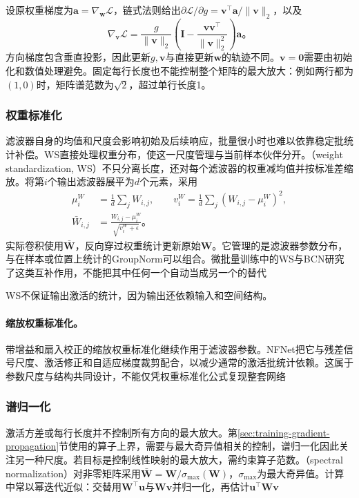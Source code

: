 设原权重梯度为$\bm a=\nabla_{\bm w}\mathcal L$，链式法则给出$\partial\mathcal L/\partial g=\bm v^{\top}\bm a/\lVert\bm v\rVert_2$，以及
\begin{equation}
  \nabla_{\bm v}\mathcal L
  =\frac{g}{\lVert\bm v\rVert_2}
    \left(\bm I-\frac{\bm v\bm v^{\top}}{\lVert\bm v\rVert_2^2}\right)\bm a\text{。}
  \label{eq:training-weightnorm-gradient}
\end{equation}
方向梯度包含垂直投影，因此更新$g,\bm v$与直接更新$\bm w$的轨迹不同。$\bm v=\bm0$需要由初始化和数值处理避免。固定每行长度也不能控制整个矩阵的最大放大：例如两行都为$(1,0)$时，矩阵谱范数为$\sqrt2$，超过单行长度1。

\subsubsection{权重标准化}
\label{sec:training-weight-standardization}
滤波器自身的均值和尺度会影响初始及后续响应，批量很小时也难以依靠稳定批统计补偿。WS直接处理权重分布，使这一尺度管理与当前样本伙伴分开。（weight standardization, WS）不只分离长度，还对每个滤波器的权重减均值并按标准差缩放。将第$i$个输出滤波器展平为$d$个元素，采用
\begin{equation}
  \begin{aligned}
    \mu_i^W&=\frac1d\sum_jW_{i,j},\qquad
    v_i^W=\frac1d\sum_j(W_{i,j}-\mu_i^W)^2,\\
    \bar W_{i,j}&=\frac{W_{i,j}-\mu_i^W}{\sqrt{v_i^W+\epsilon}}\text{。}
  \end{aligned}
  \label{eq:training-weight-standardization}
\end{equation}
实际卷积使用$\bar{\bm W}$，反向穿过权重统计更新原始$\bm W$。它管理的是滤波器参数分布，与在样本或位置上统计的GroupNorm可以组合。微批量训练中的WS与BCN研究了这类互补作用，不能把其中任何一个自动当成另一个的替代

WS不保证输出激活的统计，因为输出还依赖输入和空间结构。

\paragraph{缩放权重标准化。}

带增益和扇入校正的缩放权重标准化继续作用于滤波器参数。NFNet把它与残差信号尺度、激活修正和自适应梯度裁剪配合，以减少通常的激活批统计依赖。这属于参数尺度与结构共同设计，不能仅凭权重标准化公式复现整套网络

\subsubsection{谱归一化}
\label{sec:training-spectralnorm}
激活方差或每行长度并不控制所有方向的最大放大。第\ref{sec:training-gradient-propagation}节使用的算子上界，需要与最大奇异值相关的控制，谱归一化因此关注另一种尺度。若目标是控制线性映射的最大放大，需约束算子范数。（spectral normalization）对非零矩阵采用$\bar{\bm W}=\bm W/\sigma_{\max}(\bm W)$，$\sigma_{\max}$为最大奇异值。计算中常以幂迭代近似：交替用$\bm W^{\top}\bm u$与$\bm W\bm v$并归一化，再估计$\bm u^{\top}\bm W\bm v$

